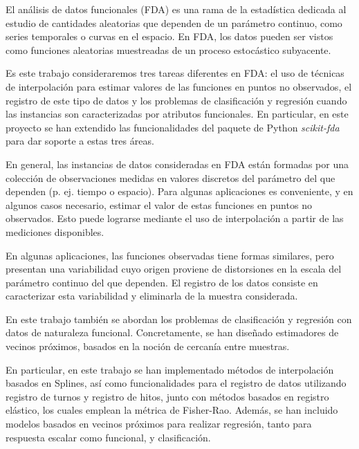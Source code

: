 El análisis de datos funcionales (FDA) es una rama de la estadística dedicada
al estudio de cantidades aleatorias que dependen de un parámetro continuo,
como series temporales o curvas en el espacio. En FDA, los datos pueden ser
vistos como funciones aleatorias muestreadas de un proceso
estocástico subyacente.

Es este trabajo consideraremos tres tareas diferentes en FDA:
el uso de técnicas de interpolación para estimar valores de las funciones
en puntos no observados,
el registro de este tipo de datos
y los problemas de clasificación y regresión cuando las instancias
son caracterizadas por atributos funcionales.
En particular, en este proyecto se han extendido las funcionalidades del
paquete de Python \textit{scikit-fda} para dar soporte a estas tres áreas.

En general, las instancias de datos consideradas en FDA están formadas por una
colección de observaciones medidas en valores discretos del parámetro del
que dependen (p. ej. tiempo o espacio).
Para algunas aplicaciones es conveniente, y en algunos casos necesario,
estimar el valor de estas funciones en puntos no observados.
Esto puede lograrse mediante el uso de interpolación a partir de las
mediciones disponibles.

En algunas aplicaciones, las funciones observadas tiene formas similares,
pero presentan una variabilidad cuyo origen proviene de
distorsiones en la escala del parámetro continuo del que
dependen. El registro de los datos consiste en caracterizar esta variabilidad
y eliminarla de la muestra considerada.


En este trabajo también se abordan los problemas de clasificación y regresión
con datos de naturaleza funcional. Concretamente, se han diseñado
estimadores de vecinos próximos, basados en la noción de cercanía entre muestras.

En particular, en este trabajo se han implementado métodos de
interpolación basados en Splines, así como funcionalidades para el
registro de datos utilizando registro de turnos y registro de hitos,
junto con métodos basados en registro elástico, los cuales emplean la métrica
de Fisher-Rao. Además, se han incluido modelos basados en vecinos próximos
para realizar regresión, tanto para respuesta escalar como funcional, y
clasificación.
